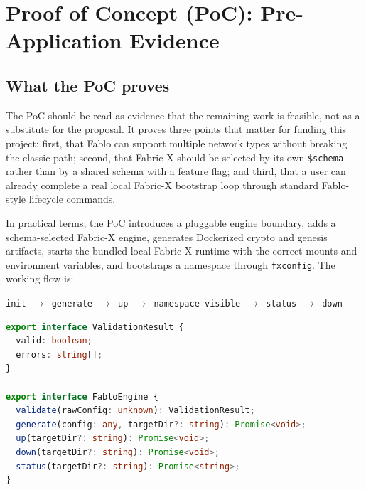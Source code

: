\section{Proof of Concept (PoC): Pre-Application Evidence}

\subsection{What the PoC proves}

The PoC should be read as evidence that the remaining work is feasible, not as a substitute for the proposal. It proves three points that matter for funding this project: first, that Fablo can support multiple network types without breaking the classic path; second, that Fabric-X should be selected by its own \texttt{\$schema} rather than by a shared schema with a feature flag; and third, that a user can already complete a real local Fabric-X bootstrap loop through standard Fablo-style lifecycle commands.

In practical terms, the PoC introduces a pluggable engine boundary, adds a schema-selected Fabric-X engine, generates Dockerized crypto and genesis artifacts, starts the bundled local Fabric-X runtime with the correct mounts and environment variables, and bootstraps a namespace through \texttt{fxconfig}. The working flow is:
\begin{center}
\texttt{init \(\rightarrow\) generate \(\rightarrow\) up \(\rightarrow\) namespace visible \(\rightarrow\) status \(\rightarrow\) down}
\end{center}

\begin{tcolorbox}[colback=gray!5!white, colframe=gray!50!black,
  title=Working engine contract from the implemented PoC,
  fonttitle=\bfseries, arc=4pt]
\begin{lstlisting}[language=typescript, basicstyle=\ttfamily\small]
export interface ValidationResult {
  valid: boolean;
  errors: string[];
}

export interface FabloEngine {
  validate(rawConfig: unknown): ValidationResult;
  generate(config: any, targetDir?: string): Promise<void>;
  up(targetDir?: string): Promise<void>;
  down(targetDir?: string): Promise<void>;
  status(targetDir?: string): Promise<string>;
}
\end{lstlisting}
\end{tcolorbox}


